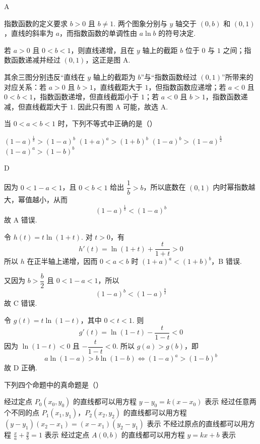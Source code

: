 \begin{answer}
A
\end{answer}

\begin{solution}
指数函数的定义要求 \(b>0\) 且 \(b\ne1\). 两个图象分别与 \(y\) 轴交于 \((0,b)\) 和 \((0,1)\)，直线的斜率为 \(a\)，而指数函数的单调性由 \(a\ln b\) 的符号决定.

若 \(a>0\) 且 \(0<b<1\)，则直线递增，且在 \(y\) 轴上的截距 \(b\) 位于 \(0\) 与 \(1\) 之间；指数函数递减并经过 \((0,1)\)，这正是图 A.

其余三图分别违反“直线在 \(y\) 轴上的截距为 \(b\)”与“指数函数经过 \((0,1)\)”所带来的对应关系：若 \(a>0\) 且 \(b>1\)，直线截距大于 \(1\)，但指数函数应递增；若 \(a<0\) 且 \(0<b<1\)，指数函数递增，但直线截距小于 \(1\)；若 \(a<0\) 且 \(b>1\)，指数函数递减，但直线截距大于 \(1\). 因此只有图 A 可能，故选 A.
\end{solution}

\begin{problem}
当 \(0<a<b<1\) 时，下列不等式中正确的是（\quad）

\choices
    {\((1 - a)^{\frac{1}{b}} > (1 - a)^{b}\)}
    {\((1 + a)^{a} > (1 + b)^{b}\)}
    {\((1 - a)^{b} > (1 - a)^{\frac{b}{2}}\)}
    {\((1 - a)^{a} > (1 - b)^{b}\)}
\end{problem}

\begin{answer}
D
\end{answer}

\begin{solution}
因为 \(0<1-a<1\)，且 \(0<b<1\) 给出 \(\dfrac1b>b\)，所以底数在 \((0,1)\) 内时幂指数越大，幂值越小，从而
\[
(1-a)^{\frac{1}{b}}<(1-a)^b
\]
故 A 错误.

令 \(h(t)=t\ln(1+t)\). 对 \(t>0\)，有
\[
h'(t)=\ln(1+t)+\frac{t}{1+t}>0
\]
所以 \(h\) 在正半轴上递增，因而 \(0<a<b\) 时 \((1+a)^a<(1+b)^b\)，B 错误.

又因为 \(b>\dfrac b2\) 且 \(0<1-a<1\)，所以
\[
(1-a)^b<(1-a)^{\frac{b}{2}}
\]
故 C 错误.

令 \(g(t)=t\ln(1-t)\)，其中 \(0<t<1\). 则
\[
g'(t)=\ln(1-t)-\frac{t}{1-t}<0
\]
因为 \(\ln(1-t)<0\) 且 \(-\dfrac{t}{1-t}<0\). 所以 \(g(a)>g(b)\)，即
\[
a\ln(1-a)>b\ln(1-b)
\iff (1-a)^a>(1-b)^b
\]
故 D 正确.
\end{solution}

\begin{problem}
下列四个命题中的真命题是（\quad）

\choices
    {经过定点 \(P_0(x_0,y_0)\) 的直线都可以用方程 \(y-y_0=k(x-x_0)\) 表示}
    {经过任意两个不同的点 \(P_1(x_1,y_1)\)，\(P_2(x_2,y_2)\) 的直线都可以用方程 \((y-y_1)(x_2-x_1)=(x-x_1)(y_2-y_1)\) 表示}
    {不经过原点的直线都可以用方程 \(\frac{x}{a}+\frac{y}{b}=1\) 表示}
    {经过定点 \(A(0,b)\) 的直线都可以用方程 \(y=kx+b\) 表示}
\end{problem}

